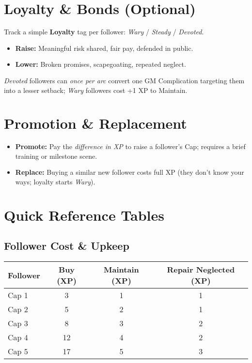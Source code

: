 \documentclass[12pt]{book}
\begin{document}
\section{Loyalty \& Bonds (Optional)}
Track a simple \textbf{Loyalty} tag per follower: \emph{Wary} / \emph{Steady} / \emph{Devoted}. 
\begin{itemize}
  \item \textbf{Raise:} Meaningful risk shared, fair pay, defended in public.
  \item \textbf{Lower:} Broken promises, scapegoating, repeated neglect.
\end{itemize}
\textit{Devoted} followers can \emph{once per arc} convert one GM Complication targeting them into a lesser setback; \textit{Wary} followers cost +1 XP to Maintain.

\section{Promotion \& Replacement}
\begin{itemize}
  \item \textbf{Promote:} Pay the \emph{difference in XP} to raise a follower’s Cap; requires a brief training or milestone scene.
  \item \textbf{Replace:} Buying a similar new follower costs full XP (they don’t know your ways; loyalty starts \emph{Wary}).
\end{itemize}

\section{Quick Reference Tables}

\subsection*{Follower Cost \& Upkeep}
\begin{center}
\begin{tabular}{lccc}
\toprule
\textbf{Follower} & \textbf{Buy (XP)} & \textbf{Maintain (XP)} & \textbf{Repair Neglected (XP)} \\
\midrule
Cap 1 & 3 & 1 & 1 \\
Cap 2 & 5 & 2 & 1 \\
Cap 3 & 8 & 3 & 2 \\
Cap 4 & 12 & 4 & 2 \\
Cap 5 & 17 & 5 & 3 \\
\bottomrule
\end{tabular}
\end{center}
\end{document}
